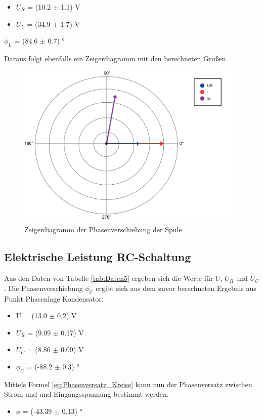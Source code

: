 \documentclass[12pt,a4paper,twoside]{article}
\begin{document}
\noindent
\begin{itemize}
    \item $U_R$ = (10.2 $\pm$ 1.1) V
    \item $U_L$ = (34.9 $\pm$ 1.7) V
\end{itemize}

\noindent
$\phi_L$ = (84.6 $\pm$ 0.7) ° \newline

\noindent
Daraus folgt ebenfalls ein Zeigerdiagramm mit den berechneten Größen.

\begin{figure}[H]
    \centering
    \includegraphics[width=0.6\linewidth]{nudes/Phasendiagramm4.png}
    \caption{Zeigerdiagramm der Phasenverschiebung der Spule}
    \label{fig:ZeigerdiagrammPhiL}
\end{figure}


\subsection{Elektrische Leistung RC-Schaltung}

Aus den Daten von Tabelle \ref{tab:Daten5} ergeben sich die Werte für $U$, $U_R$ und $U_C$. Die Phasenverschiebung $\phi_C$ ergibt sich aus dem zuvor berechneten Ergebnis aus Punkt Phasenlage Kondensator.

\begin{itemize}
    \item U = (13.0 $\pm$ 0.2) V
    \item $U_R$ = (9.09 $\pm$ 0.17) V
    \item $U_C$ = (8.86 $\pm$ 0.09) V
    \item $\phi_C$ = (-88.2 $\pm$ 0.3) °
\end{itemize}

\noindent
Mittels Formel \ref{eq:Phasenversatz_Kreise} kann nun der Phasenversatz zwischen Strom und und Eingangsspannung bestimmt werden.

\begin{itemize}
    \item $\phi$ = (-43.39 $\pm$ 0.13) °
\end{itemize}
\end{document}
